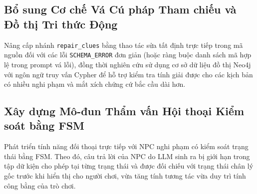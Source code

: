 \subsection{Bổ sung Cơ chế Vá Cú pháp Tham chiếu và Đồ thị Tri thức Động}
Nâng cấp nhánh \texttt{repair\_clues} bằng thao tác sửa tất định trực tiếp trong mã nguồn đối với các lỗi \texttt{SCHEMA\_ERROR} đơn giản (hoặc ràng buộc danh sách mã hợp lệ trong prompt vá lỗi), đồng thời nghiên cứu sử dụng cơ sở dữ liệu đồ thị Neo4j với ngôn ngữ truy vấn Cypher để hỗ trợ kiểm tra tính giải được cho các kịch bản có nhiều nghi phạm và mắt xích chứng cứ bắc cầu dài hơn.

\subsection{Xây dựng Mô-đun Thẩm vấn Hội thoại Kiểm soát bằng FSM}
Phát triển tính năng đối thoại trực tiếp với NPC nghi phạm có kiểm soát trạng thái bằng FSM. Theo đó, câu trả lời của NPC do LLM sinh ra bị giới hạn trong tập dữ kiện cho phép tại từng trạng thái và được đối chiếu với trạng thái chân lý gốc trước khi hiển thị cho người chơi, vừa tăng tính tương tác vừa duy trì tính công bằng của trò chơi.
